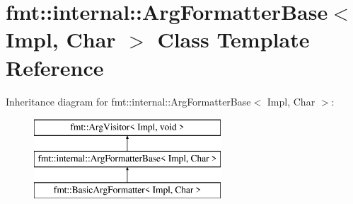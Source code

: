 \hypertarget{classfmt_1_1internal_1_1ArgFormatterBase}{}\section{fmt\+:\+:internal\+:\+:Arg\+Formatter\+Base$<$ Impl, Char $>$ Class Template Reference}
\label{classfmt_1_1internal_1_1ArgFormatterBase}
Inheritance diagram for fmt\+:\+:internal\+:\+:Arg\+Formatter\+Base$<$ Impl, Char $>$\+:\begin{figure}[H]
\begin{center}
\leavevmode
\includegraphics[height=3.000000cm]{classfmt_1_1internal_1_1ArgFormatterBase}
\end{center}
\end{figure}
